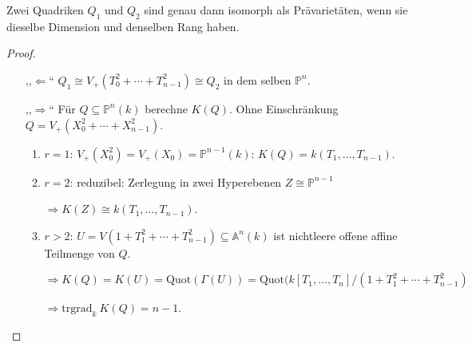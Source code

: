 \begin{cor}[orig. 61]
\label{cor:klassifikation-von-quadriken}
  Zwei Quadriken $Q_{1}$ und $Q_{2}$ sind genau dann isomorph als
  Prävarietäten, wenn sie dieselbe Dimension und denselben Rang haben.
\end{cor}
\begin{proof}
  \mbox{}
  \begin{itemize}
  \item[,,$\Leftarrow$``]
    $Q_{1}\cong V_{+}(T_{0}^{2}+\cdots+T_{n-1}^{2})\cong Q_{2}$ in
    dem selben $\mathbb{P}^{n}$.
  \item[,,$\Rightarrow$``] Für $Q\subseteq\mathbb{P}^{n}(k)$ berechne
    $K(Q)$. Ohne Einschränkung
    $Q=V_{+}(X_{0}^{2}+\cdots+X_{n-1}^{2})$.
    \begin{enumerate}
    \item $r=1$: $V_{+}(X_{0}^{2})=V_{+}(X_{0})=\mathbb{P}^{n-1}(k)$:
      $K(Q)=k(T_{1},\ldots,T_{n-1})$.
    \item $r=2$: reduzibel: Zerlegung in zwei Hyperebenen
      $Z\cong\mathbb{P}^{n-1}$

      $\Rightarrow K(Z)\cong k(T_{1},\ldots,T_{n-1})$.
    \item $r>2$:
      $U=V(1+T_{1}^{2}+\cdots+T_{n-1}^{2})\subseteq\mathbb{A}^{n}(k)$
      ist nichtleere offene affine Teilmenge von $Q$.

      $\Rightarrow K(Q)=K(U)=\text{Quot}(\Gamma(U))=\text{Quot}(k[T_{1},\ldots,T_{n}]/(1+T_{1}^{2}+\cdots+T_{n-1}^{2})$

      $\Rightarrow\text{trgrad}_{k}\ K(Q)=n-1$. 
    \end{enumerate}
  \end{itemize}
\end{proof}
